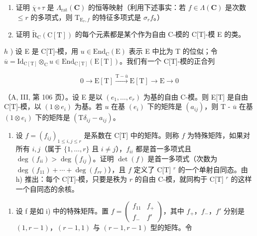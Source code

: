 \begin{enumerate}
\def\labelenumi{\alph{enumi})}
\setcounter{enumi}{5}
\tightlist
\item
  证明 \(\overline{\chi} \circ \tau\) 是 \(\Lambda_{\mathrm{rat}}(\mathbf{C})\) 的恒等映射（利用下述事实：若 \(f \in \Lambda(\mathbf{C})\) 是次数 \(\leqslant r\) 的多项式，则 \(\mathrm{T}_{\mathrm{E}_r,f}\) 的特征多项式是 \(\sigma_r f\)。）
\item
  证明 \(\tilde{\mathrm{R}}_{\mathrm{C}}(\mathrm{C}[\mathrm{T}])\) 的每个元素都是某个作为自由 C-模的 C{[}T{]}-模 E 的类。
\end{enumerate}

\(h\) ) 设 E 是 C{[}T{]}-模，用 \(u\in \mathrm{End}_{\mathrm{C}}(\mathrm{E})\) 表示 E 中比为 T 的位似；令 \(\overline{u} = \mathrm{Id}_{\mathrm{C[T]}}\otimes_{\mathrm{C}}u\in \mathrm{End}_{\mathrm{C[T]}}(\mathrm{E}[\mathrm{T}])\)。我们有一个 C{[}T{]}-模的正合列

\[
0 \longrightarrow \mathrm{E} [ \mathrm{T} ] \xrightarrow {\mathrm{T} - \bar {u}} \mathrm{E} [ \mathrm{T} ] \longrightarrow \mathrm{E} \longrightarrow 0
\]

（A, III, 第 106 页）。设 E 是以 \((e_1, \ldots, e_r)\) 为基的自由 C-模。则 E{[}T{]} 是自由 C{[}T{]}-模，以 \((1 \otimes e_i)\) 为基。若 \(u\) 在基 \((e_i)\) 下的矩阵是 \((a_{ij})\)，则 T - \(\overline{u}\) 在基 \((1 \otimes e_i)\) 下的矩阵是 \((\mathrm{T}\delta_{ij} - a_{ij})\)。

\begin{enumerate}
\def\labelenumi{\roman{enumi})}
\tightlist
\item
  设 \(f = (f_{ij})_{1 \leqslant i,j \leqslant r}\) 是系数在 C{[}T{]} 中的矩阵。则称 \(f\) 为特殊矩阵，如果对所有 \(i, j\)（属于 \(\{1, \dots, r\}\) 且 \(i \neq j\)），\(f_{ii}\) 都是首一多项式且 \(\deg(f_{ii}) > \deg(f_{ij})\)。证明 \(\det(f)\) 是首一多项式（次数为 \(\deg(f_{11}) + \cdots + \deg(f_{rr})\)），且 \(f\) 定义了 C{[}T{]} \(^r\) 的一个单射自同态。由 h) 推出：每个 C{[}T{]}-模，只要是秩为 \(r\) 的自由 C-模，就同构于 C{[}T{]} \(^r\) 的这样一个自同态的余核。
\end{enumerate}

\begin{enumerate}
\def\labelenumi{\alph{enumi})}
\setcounter{enumi}{9}
\tightlist
\item
  设 f 是如 i) 中的特殊矩阵。置 \(f = \begin{pmatrix} f_{11} & f_{+} \\ f_{-} & f' \end{pmatrix}\)，其中 \(f_{+}\)，\(f_{-}\)，\(f'\) 分别是 \((1, r - 1)\)，\((r - 1, 1)\) 与 \((r - 1, r - 1)\) 型的矩阵。令
\end{enumerate}

